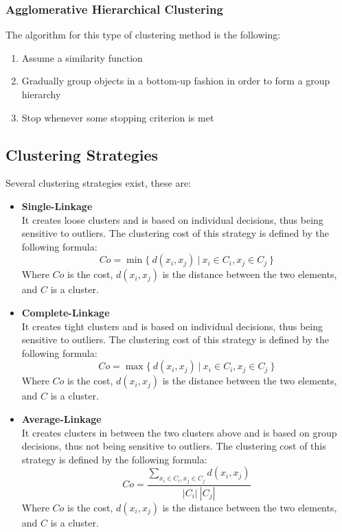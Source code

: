 \documentclass{article}
\begin{document}
\subsubsection{Agglomerative Hierarchical Clustering}
The algorithm for this type of clustering method is the following:

\begin{enumerate}
	\item Assume a similarity function
	\item Gradually group objects in a bottom-up fashion in order to form a group hierarchy
	\item Stop whenever some stopping criterion is met
\end{enumerate}

\subsection{Clustering Strategies}
Several clustering strategies exist, these are:

\begin{itemize}
	\item \textbf{Single-Linkage}
	\vspace{.2cm} \\
	It creates loose clusters and is based on individual decisions, thus being sensitive to outliers. The clustering cost of this strategy is defined by the following formula:
	\[ Co = \min\{~d(x_i, x_j)~|~x_i \in C_i, x_j \in C_j~\} \]
	Where $Co$ is the cost, $d(x_i, x_j)$ is the distance between the two elements, and $C$ is a cluster.
	
	\item \textbf{Complete-Linkage}
	\vspace{.2cm} \\
	It creates tight clusters and is based on individual decisions, thus being sensitive to outliers. The clustering cost of this strategy is defined by the following formula:
	\[ Co = \max\{~d(x_i, x_j)~|~x_i \in C_i, x_j \in C_j~\} \]
	Where $Co$ is the cost, $d(x_i, x_j)$ is the distance between the two elements, and $C$ is a cluster.
	
	\item \textbf{Average-Linkage}
	\vspace{.2cm} \\
	It creates clusters in between the two clusters above and is based on group decisions, thus not being sensitive to outliers. The clustering cost of this strategy is defined by the following formula:
	\[ Co = \frac{\sum_{x_i \in C_i, x_j \in C_j} d(x_i, x_j)}{|C_i| ~ |C_j|} \]
	Where $Co$ is the cost, $d(x_i, x_j)$ is the distance between the two elements, and $C$ is a cluster.
\end{itemize}
\end{document}
